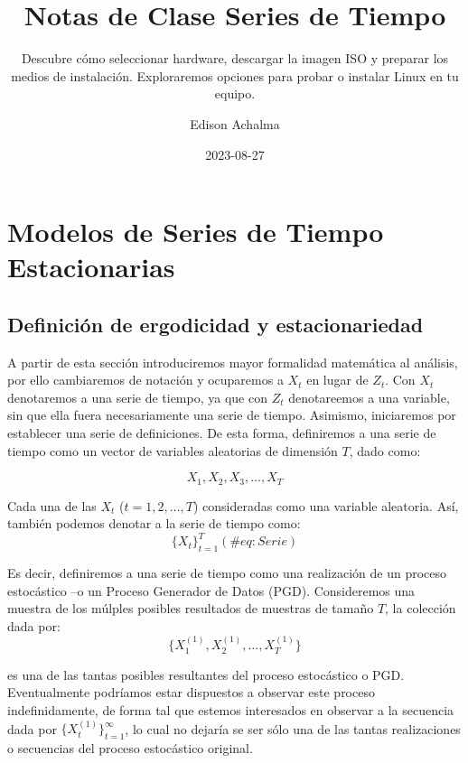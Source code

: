 \documentclass[
  a4paper,
]{article}
\title{Notas de Clase Series de Tiempo}
\subtitle{Descubre cómo seleccionar hardware, descargar la imagen ISO y
preparar los medios de instalación. Exploraremos opciones para probar o
instalar Linux en tu equipo.}
\author{Edison Achalma}
\date{2023-08-27}
\begin{document}
\maketitle
\ifdefined\Shaded\renewenvironment{Shaded}{\begin{tcolorbox}[frame hidden, boxrule=0pt, interior hidden, borderline west={3pt}{0pt}{shadecolor}, breakable, enhanced, sharp corners]}{\end{tcolorbox}}\fi

\hypertarget{modelos-de-series-de-tiempo-estacionarias}{%
\section{Modelos de Series de Tiempo
Estacionarias}\label{modelos-de-series-de-tiempo-estacionarias}}

\hypertarget{definiciuxf3n-de-ergodicidad-y-estacionariedad}{%
\subsection{Definición de ergodicidad y
estacionariedad}\label{definiciuxf3n-de-ergodicidad-y-estacionariedad}}

A partir de esta sección introduciremos mayor formalidad matemática al
análisis, por ello cambiaremos de notación y ocuparemos a \(X_t\) en
lugar de \(Z_t\). Con \(X_t\) denotaremos a una serie de tiempo, ya que
con \(Z_t\) denotareemos a una variable, sin que ella fuera
necesariamente una serie de tiempo. Asimismo, iniciaremos por establecer
una serie de definiciones. De esta forma, definiremos a una serie de
tiempo como un vector de variables aleatorias de dimensión \(T\), dado
como:

\[
    X_1, X_2, X_3, \ldots ,X_T
\]

Cada una de las \(X_t\) (\(t = 1, 2, \ldots, T\)) consideradas como una
variable aleatoria. Así, también podemos denotar a la serie de tiempo
como: \[
    \{ X_t \}^T_{t = 1}
    (\#eq:Serie)
\]

Es decir, definiremos a una serie de tiempo como una realización de un
proceso estocástico --o un Proceso Generador de Datos (PGD).
Consideremos una muestra de los múlples posibles resultados de muestras
de tamaño \(T\), la colección dada por: \[
    \{X^{(1)}_1, X^{(1)}_2, \ldots, X^{(1)}_T\}
\]

es una de las tantas posibles resultantes del proceso estocástico o PGD.
Eventualmente podríamos estar dispuestos a observar este proceso
indefinidamente, de forma tal que estemos interesados en observar a la
secuencia dada por \(\{ X^{(1)}_t \}^{\infty}_{t = 1}\), lo cual no
dejaría se ser sólo una de las tantas realizaciones o secuencias del
proceso estocástico original.
\end{document}
